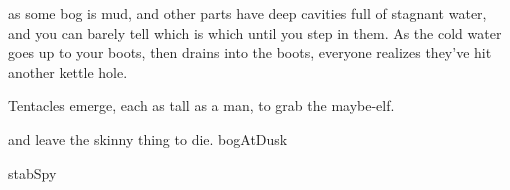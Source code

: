 as some bog is mud, and other parts have deep cavities full of stagnant water, and you can barely tell which is which until you step in them.
As the cold water goes up to your boots, then drains into the boots, everyone realizes they've hit another kettle hole.

Tentacles emerge, each as tall as a man, to grab the maybe-elf.

\begin{selectPath}
  {and leave the skinny thing to die.}%
  {bogAtDusk}

  {}%
  {stabSpy}
\end{selectPath}
